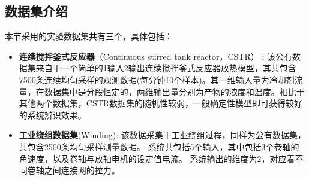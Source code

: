 \subsection{数据集介绍}
本节采用的实验数据集共有三个，具体包括：
\begin{itemize}
    \item \textbf{连续搅拌釜式反应器}（Continuous stirred tank reactor，CSTR） \cite{Demeester2019}:
    该公有数据集来自于一个简单的1输入2输出连续搅拌釜式反应器放热模型，其共包含7500条连续均匀采样的观测数据(每分钟10个样本)。其一维输入量为冷却剂流量，在数据集中是分段恒定的，两维输出量分别为产物的浓度和温度。相比于其他两个数据集，CSTR数据集的随机性较弱，一般确定性模型即可获得较好的系统辨识效果。
    
    \item \textbf{工业绕组数据集}(Winding)\cite{Demeester2019}: 
    该数据采集于工业绕组过程，同样为公有数据集，共包含2500条均匀采样测量数据。
    系统共包括5个输入，其中包括3个卷轴的角速度，以及卷轴与放轴电机的设定值电流。
    系统输出的维度为2，对应着不同卷轴之间连接网的拉力。
    

\end{itemize}
